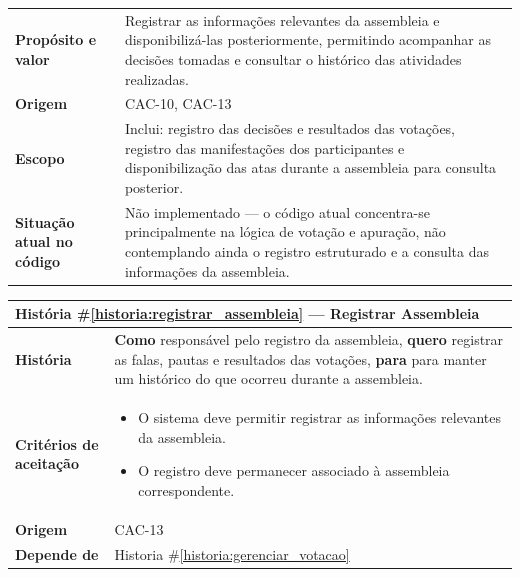 \documentclass[12pt,a4paper]{article}
\newcounter{historia}
\begin{document}
\renewcommand{\arraystretch}{1.5}
\begin{table}[H]
    \centering
    \begin{tabular}{|m{4.5cm} | m{11cm}|}
    \hline
    
    \textbf{Propósito e valor} &
    Registrar as informações relevantes da assembleia e disponibilizá-las posteriormente, permitindo acompanhar as decisões tomadas e consultar o histórico das atividades realizadas. \\

    \textbf{Origem} & CAC-10, CAC-13\\
    
    \textbf{Escopo} &
    Inclui: registro das decisões e resultados das votações, registro das manifestações dos participantes e disponibilização das atas durante a assembleia para consulta posterior. \\
    
    
    \textbf{Situação atual no código} &
    Não implementado --- o código atual concentra-se principalmente na lógica de votação e apuração, não contemplando ainda o registro estruturado e a consulta das informações da assembleia. \\
    
    \hline
    \end{tabular}
\end{table}

\vspace{0.5cm}

\label{historia:registrar_assembleia}
\begin{table}[H]
    \centering
    \begin{tabular}{|m{4.5cm} | m{11cm}|}
    \hline
    
    \multicolumn{2}{|l|}{\textbf{História \#\ref{historia:registrar_assembleia} --- Registrar Assembleia}} \\
    
    \hline  \textbf{História} &
    \textbf{Como} responsável pelo registro da assembleia, \newline
    \textbf{quero} registrar as falas, pautas e resultados das votações,\newline  
    \textbf{para} para manter um histórico do que ocorreu durante a assembleia. \\

    \textbf{Critérios de aceitação} &
    \begin{itemize}
        \item{ O sistema deve permitir registrar as informações relevantes da assembleia.}
        \item{O registro deve permanecer associado à assembleia correspondente.}
    \end{itemize}\\
    
    \textbf{Origem} &
    CAC-13\\
    
    \textbf{Depende de} &
     Historia \#\ref{historia:gerenciar_votacao} \\
    \hline
    \end{tabular}
\end{table}
\end{document}
